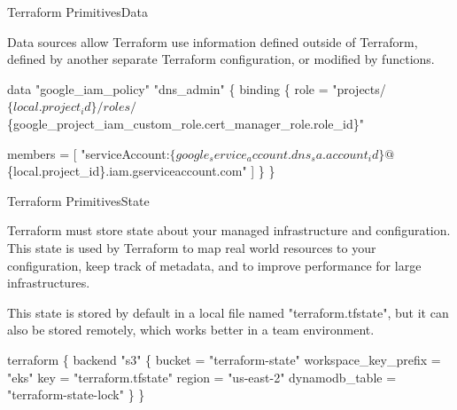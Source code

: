 \documentclass{beamer}
\begin{document}

\begin{frame}[fragile]{Terraform Primitives}{Data}

Data sources allow Terraform use information defined outside of Terraform, defined by another separate Terraform configuration, or modified by functions.

\begin{semiverbatim}
data "google_iam_policy" "dns_admin" \{
  binding \{
    role = "projects/$\{local.project_id\}/roles/$\{google_project_iam_custom_role.cert_manager_role.role_id\}"

    members = [
      "serviceAccount:$\{google_service_account.dns_sa.account_id\}@$\{local.project_id\}.iam.gserviceaccount.com"
    ]
  \}
\}
\end{semiverbatim}

\end{frame}


\begin{frame}[fragile]{Terraform Primitives}{State}

Terraform must store state about your managed infrastructure and configuration. This state is used by Terraform to map real world resources to your configuration, keep track of metadata, and to improve performance for large infrastructures.

This state is stored by default in a local file named "terraform.tfstate", but it can also be stored remotely, which works better in a team environment.

\begin{semiverbatim}
terraform \{
  backend "s3" \{
    bucket               = "terraform-state"
    workspace_key_prefix = "eks"
    key                  = "terraform.tfstate"
    region               = "us-east-2"
    dynamodb_table       = "terraform-state-lock"
  \}
\}
\end{semiverbatim}

\end{frame}

\end{document}
